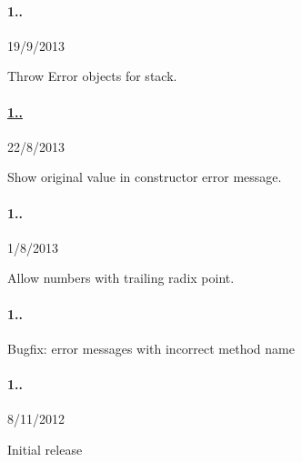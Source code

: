 \paragraph*{1..}


\begin{DoxyItemize}
\item 19/9/2013
\item Throw Error objects for stack.
\end{DoxyItemize}

\paragraph*{\hyperlink{namespace1_1_11_1_11}{1..}}


\begin{DoxyItemize}
\item 22/8/2013
\item Show original value in constructor error message.
\end{DoxyItemize}

\paragraph*{1..}


\begin{DoxyItemize}
\item 1/8/2013
\item Allow numbers with trailing radix point.
\end{DoxyItemize}

\paragraph*{1..}


\begin{DoxyItemize}
\item Bugfix\+: error messages with incorrect method name
\end{DoxyItemize}

\paragraph*{1..}


\begin{DoxyItemize}
\item 8/11/2012
\item Initial release 
\end{DoxyItemize}